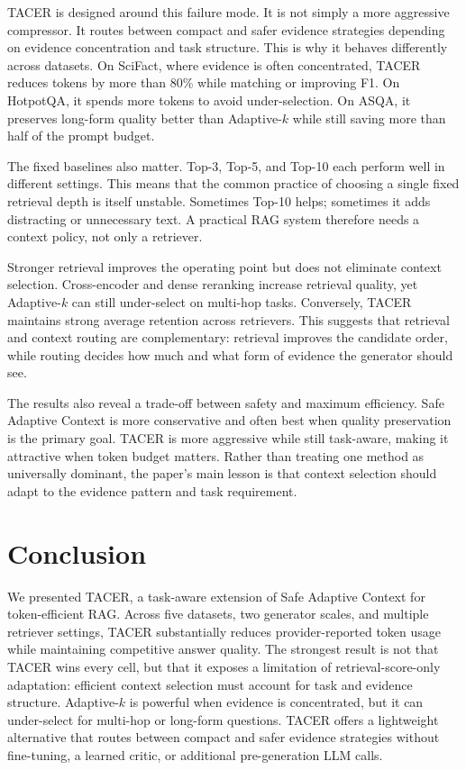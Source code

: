 \documentclass[11pt]{article}
\begin{document}
TACER is designed around this failure mode. It is not simply a more aggressive compressor. It routes between compact and safer evidence strategies depending on evidence concentration and task structure. This is why it behaves differently across datasets. On SciFact, where evidence is often concentrated, TACER reduces tokens by more than 80\% while matching or improving F1. On HotpotQA, it spends more tokens to avoid under-selection. On ASQA, it preserves long-form quality better than Adaptive-$k$ while still saving more than half of the prompt budget.

The fixed baselines also matter. Top-3, Top-5, and Top-10 each perform well in different settings. This means that the common practice of choosing a single fixed retrieval depth is itself unstable. Sometimes Top-10 helps; sometimes it adds distracting or unnecessary text. A practical RAG system therefore needs a context policy, not only a retriever.

Stronger retrieval improves the operating point but does not eliminate context selection. Cross-encoder and dense reranking increase retrieval quality, yet Adaptive-$k$ can still under-select on multi-hop tasks. Conversely, TACER maintains strong average retention across retrievers. This suggests that retrieval and context routing are complementary: retrieval improves the candidate order, while routing decides how much and what form of evidence the generator should see.

The results also reveal a trade-off between safety and maximum efficiency. Safe Adaptive Context is more conservative and often best when quality preservation is the primary goal. TACER is more aggressive while still task-aware, making it attractive when token budget matters. Rather than treating one method as universally dominant, the paper's main lesson is that context selection should adapt to the evidence pattern and task requirement.

\section{Conclusion}

We presented TACER, a task-aware extension of Safe Adaptive Context for token-efficient RAG. Across five datasets, two generator scales, and multiple retriever settings, TACER substantially reduces provider-reported token usage while maintaining competitive answer quality. The strongest result is not that TACER wins every cell, but that it exposes a limitation of retrieval-score-only adaptation: efficient context selection must account for task and evidence structure. Adaptive-$k$ is powerful when evidence is concentrated, but it can under-select for multi-hop or long-form questions. TACER offers a lightweight alternative that routes between compact and safer evidence strategies without fine-tuning, a learned critic, or additional pre-generation LLM calls.
\end{document}
